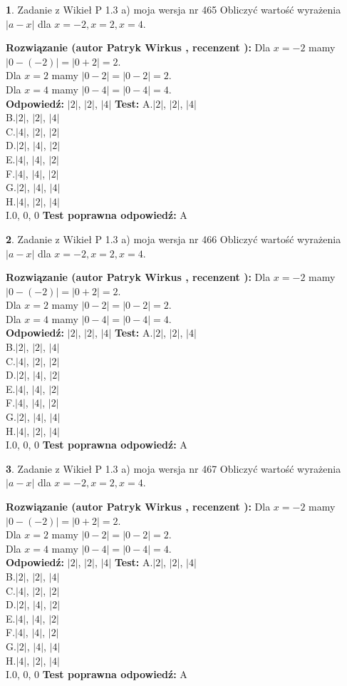 \documentclass[12pt, a4paper]{article}
\theoremstyle{definition} %
\newtheorem{zad}{}
\newcommand{\zadStart}[1]{\begin{zad}#1\newline}
\newcommand{\zadStop}{\end{zad}}
\newcommand{\rozwStart}[2]{\noindent \textbf{Rozwiązanie (autor #1 , recenzent #2): }\newline}
\newcommand{\rozwStop}{\newline}
\newcommand{\odpStart}{\noindent \textbf{Odpowiedź:}\newline}
\newcommand{\odpStop}{\newline}
\newcommand{\testStart}{\noindent \textbf{Test:}\newline}
\newcommand{\testStop}{\newline}
\newcommand{\kluczStart}{\noindent \textbf{Test poprawna odpowiedź:}\newline}
\newcommand{\kluczStop}{\newline}
\begin{document}
\zadStart{Zadanie z Wikieł P 1.3 a) moja wersja nr 465}
Obliczyć wartość wyrażenia $|a - x|$ dla $x=-2,x=2,x=4$.
\zadStop
\rozwStart{Patryk Wirkus}{}
Dla $x = -2$ mamy $|0 - (-2)| = |0 + 2| = 2$.\\
Dla $x = 2$ mamy $|0 - 2| = |0 - 2| = 2$.\\
Dla $x = 4$ mamy $|0 - 4| = |0 - 4| = 4$.\\
\rozwStop
\odpStart
$|2|$, $|2|$, $|4|$
\odpStop
\testStart
A.$|2|$, $|2|$, $|4|$\\
B.$|2|$, $|2|$, $|4|$\\
C.$|4|$, $|2|$, $|2|$\\
D.$|2|$, $|4|$, $|2|$\\
E.$|4|$, $|4|$, $|2|$\\
F.$|4|$, $|4|$, $|2|$\\
G.$|2|$, $|4|$, $|4|$\\
H.$|4|$, $|2|$, $|4|$\\
I.$0$, $0$, $0$
\testStop
\kluczStart
A
\kluczStop



\zadStart{Zadanie z Wikieł P 1.3 a) moja wersja nr 466}
Obliczyć wartość wyrażenia $|a - x|$ dla $x=-2,x=2,x=4$.
\zadStop
\rozwStart{Patryk Wirkus}{}
Dla $x = -2$ mamy $|0 - (-2)| = |0 + 2| = 2$.\\
Dla $x = 2$ mamy $|0 - 2| = |0 - 2| = 2$.\\
Dla $x = 4$ mamy $|0 - 4| = |0 - 4| = 4$.\\
\rozwStop
\odpStart
$|2|$, $|2|$, $|4|$
\odpStop
\testStart
A.$|2|$, $|2|$, $|4|$\\
B.$|2|$, $|2|$, $|4|$\\
C.$|4|$, $|2|$, $|2|$\\
D.$|2|$, $|4|$, $|2|$\\
E.$|4|$, $|4|$, $|2|$\\
F.$|4|$, $|4|$, $|2|$\\
G.$|2|$, $|4|$, $|4|$\\
H.$|4|$, $|2|$, $|4|$\\
I.$0$, $0$, $0$
\testStop
\kluczStart
A
\kluczStop



\zadStart{Zadanie z Wikieł P 1.3 a) moja wersja nr 467}
Obliczyć wartość wyrażenia $|a - x|$ dla $x=-2,x=2,x=4$.
\zadStop
\rozwStart{Patryk Wirkus}{}
Dla $x = -2$ mamy $|0 - (-2)| = |0 + 2| = 2$.\\
Dla $x = 2$ mamy $|0 - 2| = |0 - 2| = 2$.\\
Dla $x = 4$ mamy $|0 - 4| = |0 - 4| = 4$.\\
\rozwStop
\odpStart
$|2|$, $|2|$, $|4|$
\odpStop
\testStart
A.$|2|$, $|2|$, $|4|$\\
B.$|2|$, $|2|$, $|4|$\\
C.$|4|$, $|2|$, $|2|$\\
D.$|2|$, $|4|$, $|2|$\\
E.$|4|$, $|4|$, $|2|$\\
F.$|4|$, $|4|$, $|2|$\\
G.$|2|$, $|4|$, $|4|$\\
H.$|4|$, $|2|$, $|4|$\\
I.$0$, $0$, $0$
\testStop
\kluczStart
A
\kluczStop
\end{document}
